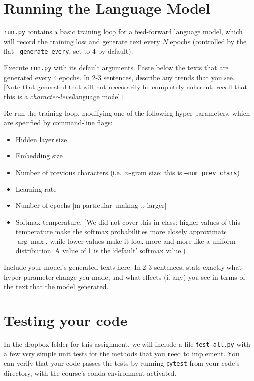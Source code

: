 \documentclass[11pt]{article}
\begin{document}
\section{Running the Language Model}

\texttt{run.py} contains a basic training loop for a feed-forward language model, which will record the training loss and generate text every $N$ epochs (controlled by the flat \texttt{--generate\_every}, set to 4 by default).

\vspace{2em}
  Execute \texttt{run.py} with its default arguments.  Paste below the texts that are generated every 4 epochs.  In 2-3 sentences, describe any trends that you see.  [Note that generated text will not necessarily be completely coherent: recall that this is a \emph{character-level}language model.]

\vspace{2em}
 Re-run the training loop, modifying one of the following hyper-parameters, which are specified by command-line flags:
\begin{itemize}
  \item Hidden layer size
  \item Embedding size
  \item Number of previous characters (i.e.\ $n$-gram size; this is \texttt{--num\_prev\_chars})
  \item Learning rate
  \item Number of epochs [in particular: making it larger]
  \item Softmax temperature.  (We did not cover this in class: higher values of this temperature make the softmax probabilities more closely approximate $\arg\max$, while lower values make it look more and more like a uniform distribution.  A value of 1 is the `default' softmax value.)
\end{itemize}
Include your model's generated texts here.  In 2-3 sentences, state exactly what hyper-parameter change you made, and what effects (if any) you see in terms of the text that the model generated.

\section{Testing your code}

In the dropbox folder for this assignment, we will include a file \texttt{test\_all.py} with a few very simple unit tests for the methods that you need to implement.  You can verify that your code passes the tests by running \texttt{pytest} from your code's directory, with the course's conda environment activated.
\end{document}
